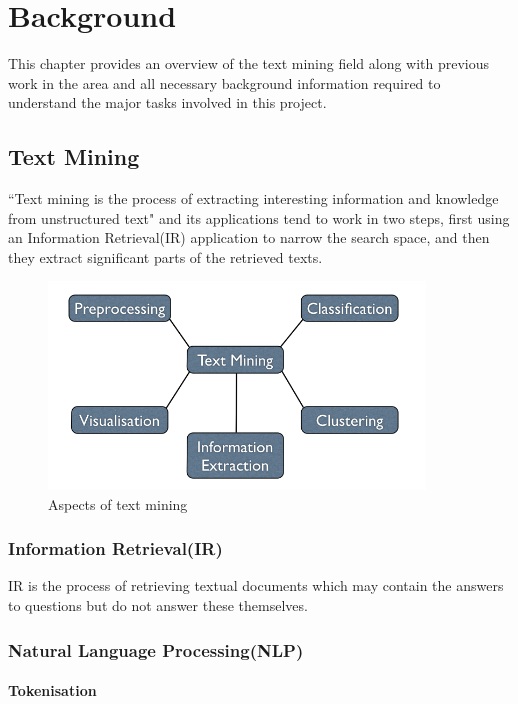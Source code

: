 \chapter{Background}
\label{cha:background}
This chapter provides an overview of the text mining field along with previous work in the area and all necessary background information required to understand the major tasks involved in this project.

\section{Text Mining}
\label{sec:textmining}
``Text mining is the process of extracting interesting information and knowledge from unstructured text"\cite{hotho-etal-ldv-2005} and its applications tend to work in two steps, first using an Information Retrieval(IR) application to narrow the search space, and then they extract significant parts of the retrieved texts\cite{Polajnar2006}.
\begin{figure}
\begin{center}
\includegraphics[width=10cm]{textmining}
\end{center}
\caption{Aspects of text mining}
\label{fig:design}  
\end{figure}


\subsection[Information Retrieval]{Information Retrieval(IR)}
IR is the process of retrieving textual documents which may contain the answers to questions but do not answer these themselves\cite{hotho-etal-ldv-2005}.
\subsection[Natural Language Processing]{Natural Language Processing(NLP)}
\subsubsection{Tokenisation}
